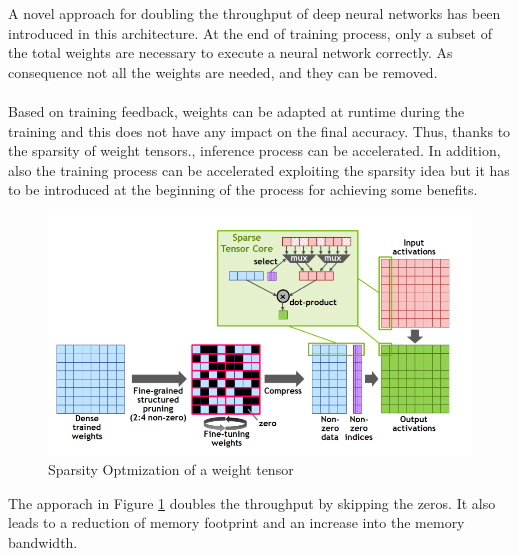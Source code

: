 A novel approach for doubling the throughput of deep neural networks has been introduced in this architecture. At the end of training process, only a subset of the total weights are necessary to execute a neural network correctly. As consequence not all the weights are needed, and they can be removed.\\\\
Based on training feedback, weights can be adapted at runtime during the training and this does not have any impact on the final accuracy. Thus, thanks to the sparsity of weight tensors., inference process can be accelerated. In addition, also the training process can be accelerated exploiting the sparsity idea but it has to be introduced at the beginning of the process for achieving some benefits.

\begin{figure}[!htbp]
\centering
\captionsetup{justification=centering}
\includegraphics[scale=0.4]{./figure/sparsity.png}
\caption{Sparsity Optmization of a weight tensor \cite{paper:41}}
\label{fig:spa}
\end{figure}
The apporach in Figure \ref{fig:spa} doubles the throughput by skipping the zeros. It also leads to a reduction of memory footprint and an increase into the memory bandwidth.\\\\

